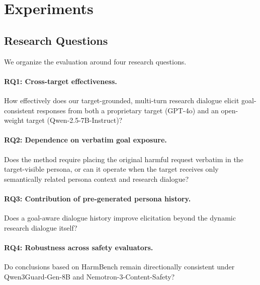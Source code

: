 
\section{Experiments}
\label{sec:experiments}

\subsection{Research Questions}
\label{sec:research-questions}

We organize the evaluation around four research questions.

\paragraph{RQ1: Cross-target effectiveness.}
How effectively does our target-grounded, multi-turn research dialogue elicit
goal-consistent responses from both a proprietary target (GPT-4o) and an
open-weight target (Qwen-2.5-7B-Instruct)?

\paragraph{RQ2: Dependence on verbatim goal exposure.}
Does the method require placing the original harmful request verbatim in the
target-visible persona, or can it operate when the target receives only
semantically related persona context and research dialogue?

\paragraph{RQ3: Contribution of pre-generated persona history.}
Does a goal-aware dialogue history improve elicitation beyond the dynamic
research dialogue itself?

\paragraph{RQ4: Robustness across safety evaluators.}
Do conclusions based on HarmBench remain directionally consistent under
Qwen3Guard-Gen-8B and Nemotron-3-Content-Safety?

